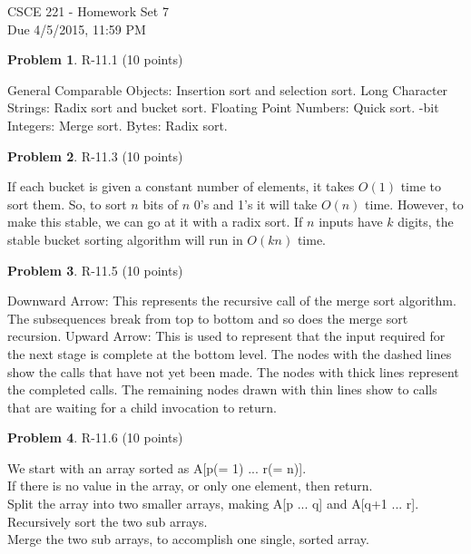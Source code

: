 \documentclass[12pt]{report}
\theoremstyle{definition}
\newtheorem{problem}{Problem}
\begin{document}
\vspace*{-15mm}
\begin{center}
{\large
				CSCE 221 - Homework Set 7 \\
				Due 4/5/2015, 11:59 PM}
\end{center}

\begin{problem} 	R-11.1 (10 points) 		
\end{problem}
				General Comparable Objects: Insertion sort and selection sort. \smallskip 	\newline
				Long Character Strings: Radix sort and bucket sort. \smallskip \newline
				Floating Point Numbers: Quick sort. \smallskip {}-bit Integers: Merge sort. \smallskip \newline
				Bytes: Radix sort.

\begin{problem} 	R-11.3 (10 points) 		
\end{problem}
				\noindent If each bucket is given a constant number of elements, it takes $O(1)$ time to sort 				them. So, to sort $n$ bits of $n$ 0's and 1's it will take $O(n)$ time. However, to make this 				stable, we can go at it with a radix sort. If $n$ inputs have $k$ digits, the stable bucket 					sorting algorithm will run in $O(kn)$ time.
				
\begin{problem} 	R-11.5 (10 points) 		
\end{problem}
				Downward Arrow: This represents the recursive call of the merge sort algorithm. The 					subsequences break from top to bottom and so does the merge sort recursion. \smallskip 						\newline
				Upward Arrow: This is used to represent that the input required for the next stage is complete 				at the bottom level. The nodes with the dashed lines show the calls that have not yet been 				made. The nodes with thick lines represent the completed calls. The remaining nodes drawn 				with thin lines show to calls that are waiting for a child invocation to return.

\begin{problem} 	R-11.6 (10 points) 		
\end{problem}
				We start with an array sorted as A[p(= 1) ... r(= n)]. \\
				If there is no value in the array, or only one element, then return. \\
				Split the array into two smaller arrays, making A[p ... q] and A[q+1 ... r]. \\
				Recursively sort the two sub arrays. \\
				Merge the two sub arrays, to accomplish one single, sorted array.
\end{document}
